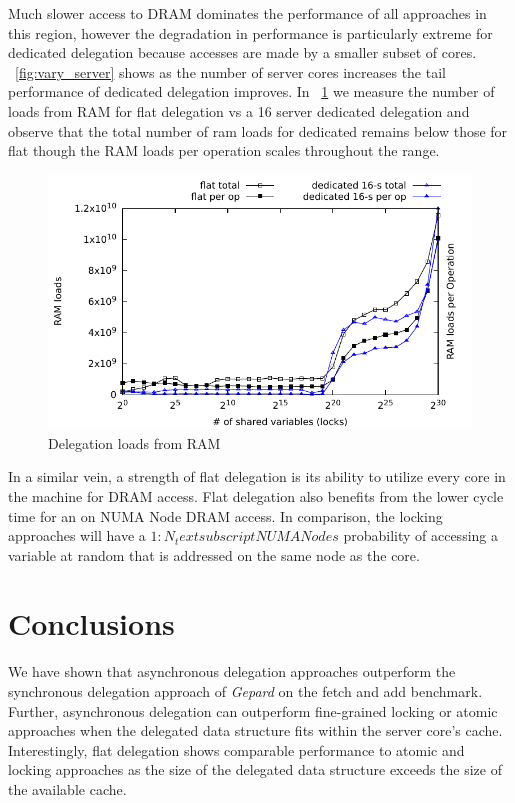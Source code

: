 \documentclass{uicthesi}
\begin{document}
Much slower access to DRAM dominates the performance of all approaches in this region, however the degradation in performance is particularly extreme for dedicated delegation because accesses are made by a smaller subset of cores. ~\ref{fig:vary_server} shows as the number of server cores increases the tail performance of dedicated delegation improves. In ~\ref{fig:ram_loads} we measure the number of loads from RAM for flat delegation vs a 16 server dedicated delegation and observe that the total number of ram loads for dedicated remains below those for flat though the RAM loads per operation scales throughout the range.  

\begin{figure}[ht!]
\centering
\includegraphics[width=0.9\columnwidth]{FIG/ram_accesses_by_type.pdf}
\caption{Delegation loads from RAM}
\label{fig:ram_loads}
\end{figure}

In a similar vein, a strength of flat delegation is its ability to utilize every core in the machine for DRAM access. Flat delegation also benefits from the lower cycle time for an on NUMA Node DRAM access. In comparison, the locking approaches will have a $1:N_textsubscript{NUMA Nodes} $ probability of accessing a variable at random that is addressed on the same node as the core. 


\chapter{Conclusions}
We have shown that asynchronous delegation approaches outperform the synchronous delegation approach of \textit{Gepard} on the fetch and add benchmark.  Further, asynchronous delegation can outperform fine-grained locking or atomic approaches when the delegated data structure fits within the server core's cache. Interestingly, flat delegation shows comparable performance to atomic and locking approaches as the size of the delegated data structure exceeds the size of the available cache. 
\end{document}
